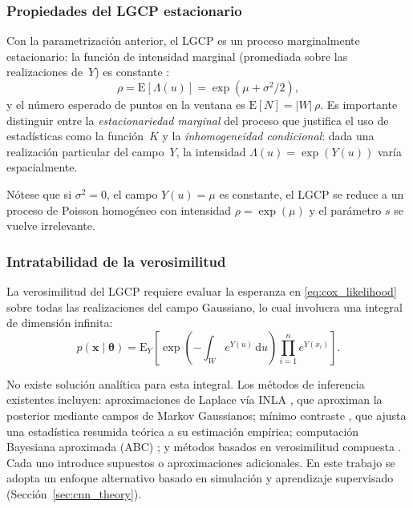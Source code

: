 \documentclass[a4paper,fleqn]{cas-sc}
\numberwithin{equation}{section}
\begin{document}
\subsubsection{Propiedades del LGCP estacionario}

Con la parametrizaci\'on anterior, el LGCP es un proceso marginalmente
estacionario: la funci\'on de intensidad marginal (promediada sobre las
realizaciones de~$Y$) es constante \citep{Moller1998}:
\begin{equation}
    \rho = \mathrm{E}[\Lambda(u)] = \exp(\mu + \sigma^2/2),
    \label{eq:lgcp_rho}
\end{equation}
y el n\'umero esperado de puntos en la ventana es
$\mathrm{E}[N] = |W|\,\rho$. Es importante distinguir entre la
\emph{estacionariedad marginal} del proceso que justifica el uso de
estad\'isticas como la funci\'on~$K$ y la \emph{inhomogeneidad
condicional}: dada una realizaci\'on particular del campo~$Y$, la intensidad $\Lambda(u)=\exp(Y(u))$ var\'ia espacialmente.

N\'otese que si $\sigma^2=0$, el campo $Y(u)=\mu$ es constante, el LGCP se
reduce a un proceso de Poisson homog\'eneo con intensidad $\rho=\exp(\mu)$ y el par\'ametro $s$ se vuelve irrelevante.

\subsubsection{Intratabilidad de la verosimilitud}

La verosimilitud del LGCP requiere evaluar la esperanza en
\eqref{eq:cox_likelihood} sobre todas las realizaciones del campo Gaussiano, lo
cual involucra una integral de dimensi\'on infinita:
\begin{equation}
    p(\mathbf{x}\mid\boldsymbol{\theta}) =
    \mathrm{E}_{Y}\!\left[\exp\!\left(-\int_W\!e^{Y(u)}\,\mathrm{d}u\right)
    \prod_{i=1}^{n}e^{Y(x_i)}\right].
    \label{eq:lgcp_lik}
\end{equation}

No existe soluci\'on anal\'itica para esta integral. Los m\'etodos de
inferencia existentes incluyen: aproximaciones de Laplace v\'ia INLA
\citep{Rue2009,toolboxINLA}, que aproximan la posterior mediante campos de
Markov Gaussianos; m\'inimo contraste \citep{mincon83, mincon84}, que ajusta una estad\'istica resumida te\'orica a su estimaci\'on emp\'irica;
computaci\'on Bayesiana aproximada (ABC) \citep{ABCoverview}; y m\'etodos
basados en verosimilitud compuesta \citep{complik}. Cada uno introduce
supuestos o aproximaciones adicionales. En este trabajo se adopta un enfoque alternativo basado en simulaci\'on y aprendizaje supervisado
(Secci\'on~\ref{sec:cnn_theory}).
\end{document}

